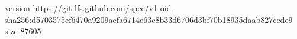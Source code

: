 version https://git-lfs.github.com/spec/v1
oid sha256:d5703575ef6470a9209aefa6714e63c8b33d6706d3bf70b18935daab827cede9
size 87605
